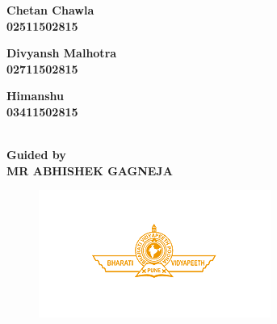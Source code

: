 \begin{center}
\vspace{0.25in}
\begin{minipage}{0.35\linewidth}
\begin{center}
\textbf{Chetan Chawla\\
02511502815}
\end{center}
\end{minipage}
\begin{minipage}{0.30\linewidth}
\begin{center}
\textbf{Divyansh Malhotra\\
02711502815}    
\end{center}
\end{minipage}
\begin{minipage}{0.30\linewidth}
\begin{center}
\textbf{Himanshu\\
03411502815}    
\end{center}
\end{minipage}
\vspace{0.5in}
\large{\textbf{\\Guided by\\}}
\Large{\textbf{MR ABHISHEK GAGNEJA}}\\
\begin{figure}[hbtp]
  \centering
  \vspace{-0.8in}
    \includegraphics[scale= 1.5]{SummerInterReport/project/Images-Major/bvp.png}
    \vspace{-0.8in}
\end{figure}


\end{center}
